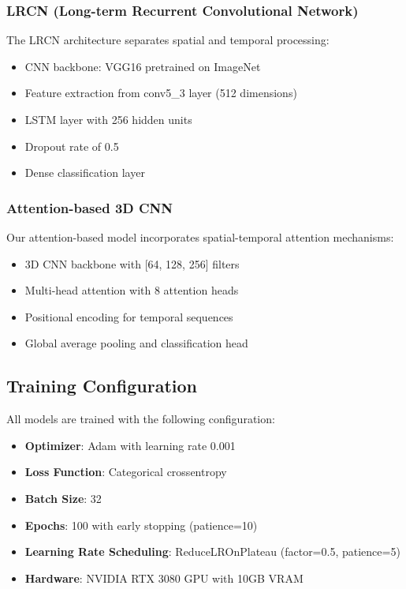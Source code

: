\documentclass[twocolumn]{article}
\begin{document}
\subsubsection{LRCN (Long-term Recurrent Convolutional Network)}
The LRCN architecture separates spatial and temporal processing:
\begin{itemize}
    \item CNN backbone: VGG16 pretrained on ImageNet
    \item Feature extraction from conv5\_3 layer (512 dimensions)
    \item LSTM layer with 256 hidden units
    \item Dropout rate of 0.5
    \item Dense classification layer
\end{itemize}

\subsubsection{Attention-based 3D CNN}
Our attention-based model incorporates spatial-temporal attention mechanisms:
\begin{itemize}
    \item 3D CNN backbone with [64, 128, 256] filters
    \item Multi-head attention with 8 attention heads
    \item Positional encoding for temporal sequences
    \item Global average pooling and classification head
\end{itemize}

\subsection{Training Configuration}
All models are trained with the following configuration:
\begin{itemize}
    \item \textbf{Optimizer}: Adam with learning rate 0.001
    \item \textbf{Loss Function}: Categorical crossentropy
    \item \textbf{Batch Size}: 32
    \item \textbf{Epochs}: 100 with early stopping (patience=10)
    \item \textbf{Learning Rate Scheduling}: ReduceLROnPlateau (factor=0.5, patience=5)
    \item \textbf{Hardware}: NVIDIA RTX 3080 GPU with 10GB VRAM
\end{itemize}
\end{document}
